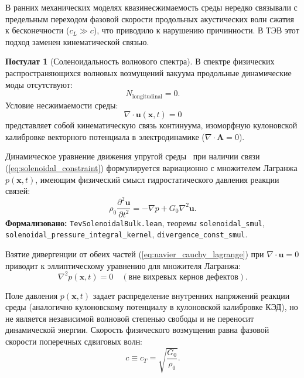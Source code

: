 \documentclass[11pt,a4paper]{article}
\theoremstyle{definition}
\newtheorem{postulate}{Постулат}
\theoremstyle{remark}
\begin{document}
В ранних механических моделях квазинесжимаемость среды нередко связывали с предельным переходом фазовой скорости продольных акустических волн сжатия к бесконечности ($c_L \gg c$), что приводило к нарушению причинности. В ТЭВ этот подход заменен кинематической связью.
	
\begin{postulate}[Соленоидальность волнового спектра]
	В спектре физических распространяющихся волновых возмущений вакуума продольные динамические моды отсутствуют:
\begin{equation}
	N_{\mathrm{longitudinal}} = 0.
	\label{eq:n_longitudinal_zero}
\end{equation}
	Условие несжимаемости среды:
\begin{equation}
	\nabla \cdot \mathbf{u}(\mathbf{x}, t) = 0
	\label{eq:solenoidal_constraint}
\end{equation}
	представляет собой кинематическую связь континуума, изоморфную кулоновской калибровке векторного потенциала в электродинамике ($\nabla \cdot \mathbf{A} = 0$).
\end{postulate}
	
Динамическое уравнение движения упругой среды~\cite{Navier1827,Cauchy1828} при наличии связи (\ref{eq:solenoidal_constraint}) формулируется вариационно с множителем Лагранжа $p(\mathbf{x}, t)$, имеющим физический смысл гидростатического давления реакции связей:
\begin{equation}
	\rho_0 \frac{\partial^2 \mathbf{u}}{\partial t^2} = -\nabla p + G_0 \nabla^2 \mathbf{u}.
	\label{eq:navier_cauchy_lagrange}
\end{equation}
\noindent\small\textbf{Формализовано:} \texttt{TevSolenoidalBulk.lean}, теоремы \texttt{solenoidal_smul}, \texttt{solenoidal_pressure_integral_kernel}, \texttt{divergence\_const\_smul}.

Взятие дивергенции от обеих частей (\ref{eq:navier_cauchy_lagrange}) при $\nabla \cdot \mathbf{u} = 0$ приводит к эллиптическому уравнению для множителя Лагранжа:
\begin{equation}
	\nabla^2 p(\mathbf{x}, t) = 0 \quad (\text{вне вихревых кернов дефектов}).
	\label{eq:laplace_pressure}
\end{equation}
	
Поле давления $p(\mathbf{x}, t)$ задает распределение внутренних напряжений реакции среды (аналогично кулоновскому потенциалу в кулоновской калибровке КЭД), но не является независимой волновой степенью свободы и не переносит динамической энергии. Скорость физического возмущения равна фазовой скорости поперечных сдвиговых волн:
\begin{equation}
	c \equiv c_T = \sqrt{\frac{G_0}{\rho_0}}.
	\label{eq:speed_of_light_def}
\end{equation}
	
\end{document}
